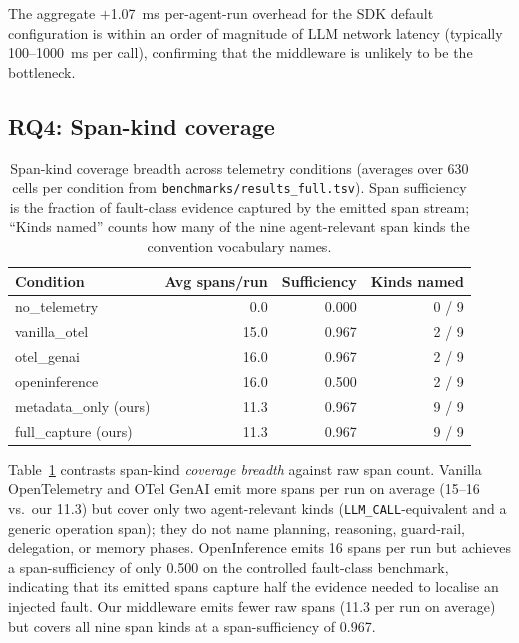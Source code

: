 \documentclass[sigconf,review,anonymous,9pt]{acmart}
\begin{document}
The aggregate $+$1.07~ms per-agent-run overhead for the SDK default
configuration is within an order of magnitude of LLM network
latency (typically 100--1000~ms per call), confirming that the
middleware is unlikely to be the bottleneck.

\subsection{RQ4: Span-kind coverage}

\begin{table}[t]
\centering
\small
\caption{Span-kind coverage breadth across telemetry conditions
(averages over 630 cells per condition from
\texttt{benchmarks/results\_full.tsv}). Span sufficiency is the
fraction of fault-class evidence captured by the emitted span
stream; ``Kinds named'' counts how many of the nine agent-relevant
span kinds the convention vocabulary names.}
\label{tab:coverage}
\begin{tabular}{@{}lrrr@{}}
\toprule
\textbf{Condition}     & \textbf{Avg spans/run} & \textbf{Sufficiency} & \textbf{Kinds named} \\
\midrule
no\_telemetry          &  0.0 & 0.000 & 0 / 9 \\
vanilla\_otel          & 15.0 & 0.967 & 2 / 9 \\
otel\_genai            & 16.0 & 0.967 & 2 / 9 \\
openinference          & 16.0 & 0.500 & 2 / 9 \\
metadata\_only (ours)  & 11.3 & 0.967 & 9 / 9 \\
full\_capture (ours)   & 11.3 & 0.967 & 9 / 9 \\
\bottomrule
\end{tabular}
\end{table}

Table~\ref{tab:coverage} contrasts span-kind \emph{coverage breadth}
against raw span count. Vanilla OpenTelemetry and OTel GenAI emit
more spans per run on average (15--16 vs.\ our 11.3) but cover only
two agent-relevant kinds (\texttt{LLM\_CALL}-equivalent and a
generic operation span); they do not name planning, reasoning,
guard-rail, delegation, or memory phases. OpenInference emits 16
spans per run but achieves a span-sufficiency of only 0.500 on the
controlled fault-class benchmark, indicating that its emitted spans
capture half the evidence needed to localise an injected fault.
Our middleware emits fewer raw spans (11.3 per run on average) but
covers all nine span kinds at a span-sufficiency of 0.967.
\end{document}
